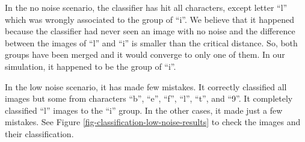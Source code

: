 In the no noise scenario, the classifier has hit all characters, except letter ``l'' which was wrongly associated to the group of ``i''. We believe that it happened because the classifier had never seen an image with no noise and the difference between the images of ``l'' and ``i'' is smaller than the critical distance. So, both groups have been merged and it would converge to only one of them. In our simulation, it happened to be the group of ``i''.

In the low noise scenario, it has made few mistakes. It correctly classified all images but some from characters ``b'', ``e'', ``f'', ``l'', ``t'', and ``9''. It completely classified ``l'' images to the ``i'' group. In the other cases, it made just a few mistakes. See Figure \ref{fig-classification-low-noise-results} to check the images and their classification.

